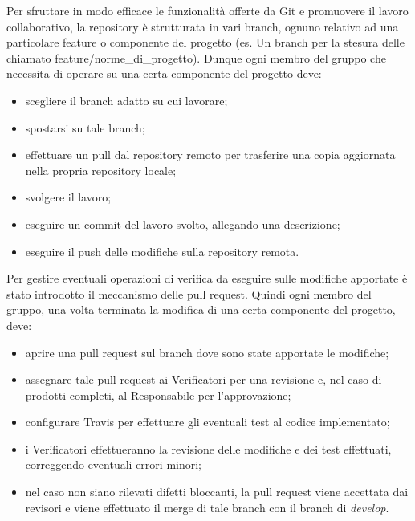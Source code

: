         Per sfruttare in modo efficace le funzionalità offerte da Git e promuovere il lavoro collaborativo, la repository è strutturata in vari branch, ognuno relativo ad una particolare feature o componente del progetto (es. Un branch per la stesura delle \NdP{} chiamato feature/norme\_di\_progetto). Dunque ogni membro del gruppo che necessita di operare su una certa componente del progetto deve:
        \begin{itemize}
          \item scegliere il branch adatto su cui lavorare;
          \item spostarsi su tale branch;
          \item effettuare un pull dal repository remoto per trasferire una copia aggiornata nella propria repository locale;
          \item svolgere il lavoro;
          \item eseguire un commit del lavoro svolto, allegando una descrizione;
          \item eseguire il push delle modifiche sulla repository remota.
        \end{itemize}
    	Per gestire eventuali operazioni di verifica da eseguire sulle modifiche apportate è stato introdotto il meccanismo delle pull request. Quindi ogni membro del gruppo, una volta terminata la modifica di una certa componente del progetto, deve:
    	\begin{itemize}
    		\item aprire una pull request sul branch dove sono state apportate le modifiche;
    		\item assegnare tale pull request ai Verificatori per una revisione e, nel caso di prodotti completi, al Responsabile per l'approvazione;
    		\item configurare Travis per effettuare gli eventuali test al codice implementato;
    		\item i Verificatori effettueranno la revisione delle modifiche e dei test effettuati, correggendo eventuali errori minori;
    		\item nel caso non siano rilevati difetti bloccanti, la pull request viene accettata dai revisori e viene effettuato il merge di tale branch con il branch di \textit{develop}.
    	\end{itemize}

